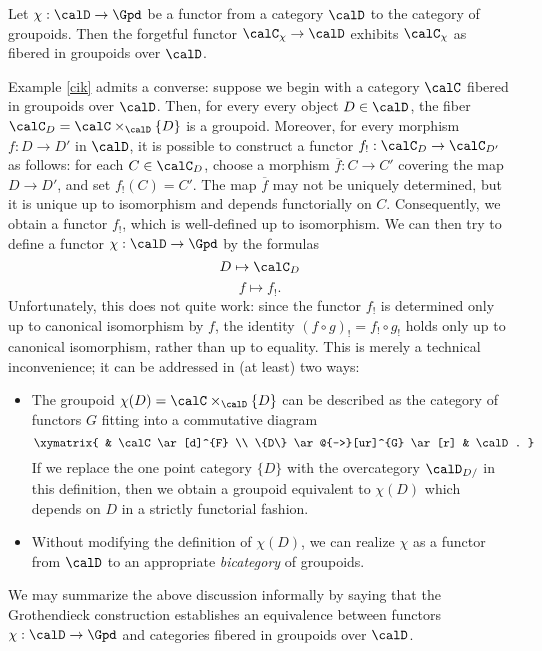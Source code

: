 \begin{example}\label{cik}
Let $\chi: \calD \rightarrow \Gpd$ be a functor from a category $\calD$
to the category of groupoids. Then the forgetful functor $\calC_{\chi} \rightarrow \calD$ exhibits $\calC_{\chi}$ as fibered in groupoids over $\calD$.
\end{example}

Example \ref{cik} admits a converse: suppose we begin with a category
$\calC$ fibered in groupoids over $\calD$. Then, for every 
every object $D \in \calD$, the fiber $\calC_{D} = \calC \times_{\calD} \{D\}$ is a
groupoid. Moreover, for every morphism $f: D \rightarrow D'$ in $\calD$, it
is possible to construct a functor $f_{!}: \calC_{D} \rightarrow \calC_{D'}$
as follows: for each $C \in \calC_{D}$, choose a morphism $\overline{f}: C \rightarrow C'$ covering the map $D \rightarrow D'$, and set $f_{!}(C) = C'$. The map $\overline{f}$ may not be uniquely determined, but it is unique up to isomorphism and depends functorially on $C$. Consequently, we obtain a
functor $f_{!}$, which is well-defined up to isomorphism. We can then
try to define a functor $\chi: \calD \rightarrow \Gpd$ by the formulas
$$ D \mapsto \calC_{D}$$
$$ f \mapsto f_{!}.$$
Unfortunately, this does not quite work: since the functor $f_{!}$ is determined only up to canonical isomorphism by $f$, the identity $(f \circ g)_{!} = f_{!} \circ g_{!}$
holds only up to canonical isomorphism, rather than up to equality. This is merely a technical inconvenience; it can be addressed in (at least) two ways:
\begin{itemize}
\item The groupoid $\chi(D) = \calC \times_{\calD} \{D\}$ can be described as the category of functors $G$ fitting into a commutative diagram
$$ \xymatrix{ & \calC \ar[d]^{F} \\
\{D\} \ar@{-->}[ur]^{G} \ar[r] & \calD. }$$
If we replace the one point category $\{D\}$ with the overcategory $\calD_{D/}$ in this definition, then we obtain a groupoid equivalent to $\chi(D)$ which
depends on $D$ in a strictly functorial fashion.
\item Without modifying the definition of $\chi(D)$, we can realize
$\chi$ as a functor from $\calD$ to an appropriate {\it bicategory} of groupoids.
\end{itemize}

We may summarize the above discussion informally by saying that the Grothendieck construction establishes an equivalence between functors
$\chi: \calD \rightarrow \Gpd$ and categories fibered in groupoids over $\calD$.

